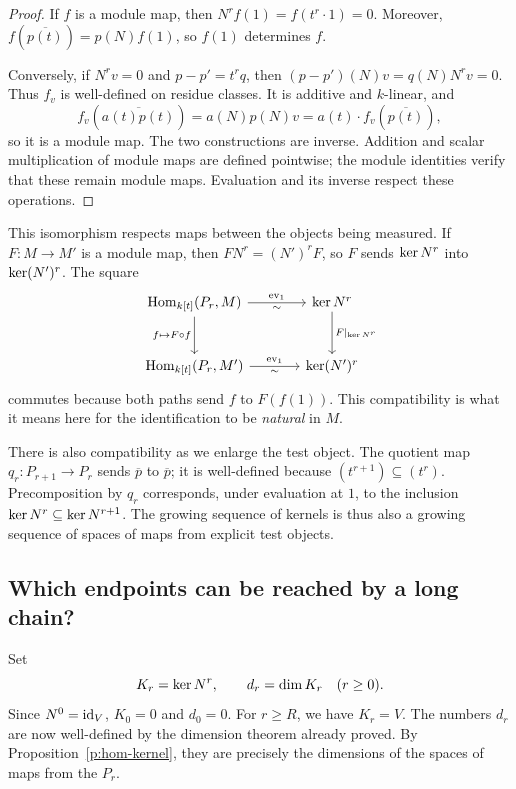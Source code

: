 \begin{proof}
If $f$ is a module map, then
$N^rf(1)=f(t^r\cdot1)=0$. Moreover,
$f(\overline{p(t)})=p(N)f(1)$, so $f(1)$ determines $f$.

Conversely, if $N^rv=0$ and $p-p'=t^rq$, then
$(p-p')(N)v=q(N)N^rv=0$. Thus $f_v$ is well-defined on residue classes.
It is additive and $k$-linear, and
\[
 f_v(\overline{a(t)p(t)})=a(N)p(N)v
 =a(t)\cdot f_v(\overline{p(t)}),
\]
so it is a module map. The two constructions are inverse. Addition and
scalar multiplication of module maps are defined pointwise; the module
identities verify that these remain module maps. Evaluation and its inverse
respect these operations.
\end{proof}

This isomorphism respects maps between the objects being measured. If
$F:M\to M'$ is a module map, then $FN^r=(N')^rF$, so $F$ sends
$\operatorname{ker} N^r$ into $\operatorname{ker}(N')^r$. The square
\[
\begin{tikzcd}[column sep=large,row sep=large]
\Hom_{k[t]}(P_r,M) \arrow[r,"\operatorname{ev}_1","\sim"']
  \arrow[d,"f\mapsto F\circ f"']
  & \Ker N^r \arrow[d,"F|_{\Ker N^r}"] \\
\Hom_{k[t]}(P_r,M') \arrow[r,"\operatorname{ev}_1","\sim"']
  & \Ker (N')^r
\end{tikzcd}
\]
commutes because both paths send $f$ to $F(f(1))$. This compatibility is what
it means here for the identification to be \emph{natural} in $M$.

There is also compatibility as we enlarge the test object. The quotient
map $q_r:P_{r+1}\to P_r$ sends $\overline p$ to $\overline p$; it is
well-defined because $(t^{r+1})\subseteq(t^r)$. Precomposition by $q_r$
corresponds, under evaluation at $1$, to the inclusion
$\operatorname{ker} N^r\subseteq\operatorname{ker} N^{r+1}$. The growing sequence of kernels is thus
also a growing sequence of spaces of maps from explicit test objects.

\subsection{Which endpoints can be reached by a long chain?}
\label{p:bottom-spaces}

Set
\[
 K_r=\operatorname{ker} N^r,\qquad d_r=\dim K_r\quad(r\geq0).
\]
Since $N^0=\mathrm{id}_V$, $K_0=0$ and $d_0=0$. For $r\geq R$, we have
$K_r=V$. The numbers $d_r$ are now well-defined by the dimension theorem
already proved. By Proposition~\ref{p:hom-kernel}, they are precisely the
dimensions of the spaces of maps from the $P_r$.

